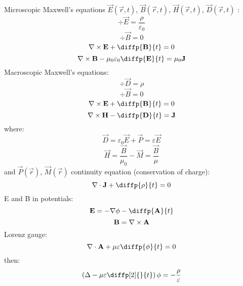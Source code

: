 Microscopic Maxwell's equations $ \vec{E}\left( \vec{r}, t \right) $, $ \vec{B}\left( \vec{r}, t \right) $, $ \vec{H}\left( \vec{r}, t \right) $, $ \vec{D}\left( \vec{r}, t \right) $ :
\begin{equation}
\div{\vec{E}} = \frac{\rho}{\varepsilon_0}
\end{equation}
\begin{equation}
\div{\vec{B}} = 0
\end{equation}
\begin{equation}
\rot{\vec{E}} + \diffp{\vec{B}}{t} = 0
\end{equation}
\begin{equation}
\rot{\vec{B}} - \mu_0 \varepsilon_0 \diffp{\vec{E}}{t}= \mu_0 \vec{J}
\end{equation}
Macroscopic Maxwell's equations:
\begin{equation}
\div{\vec{D}} = \rho
\end{equation}
\begin{equation}
\div{\vec{B}} = 0
\end{equation}
\begin{equation}
\rot{\vec{E}} + \diffp{\vec{B}}{t} = 0
\end{equation}
\begin{equation}
\rot{\vec{H}} - \diffp{\vec{D}}{t} = \vec{J}
\end{equation}
where:
\begin{equation}
\vec{D} = \varepsilon_0 \vec{E} + \vec{P} = \varepsilon \vec{E}
\end{equation}
\begin{equation}
\vec{H} = \frac{\vec{B}}{\mu_0} - \vec{M} = \frac{\vec{B}}{\mu} 
\end{equation}
and $ \vec{P}\left(\vec{r} \right) $, $ \vec{M}\left( \vec{r} \right) $
continuity equation (conservation of charge):
\begin{equation}
\div{\vec{J}} + \diffp{\rho}{t} = 0
\end{equation}
E and B in potentials:
\begin{equation}
\vec{E} = -\grad{\phi} - \diffp{\vec{A}}{t}
\end{equation}
\begin{equation}
\mathbf{B} = \nabla \times \mathbf{A}
\end{equation}
Lorenz gauge:
\begin{equation}
\div{\vec{A}} + \mu \varepsilon \diffp{\phi}{t} = 0
\end{equation}
then:
\begin{equation}
\left(\laplace{} - \mu \varepsilon \diffp[2]{}{t} \right)\phi = -\frac{\rho}{\varepsilon}
\end{equation}
